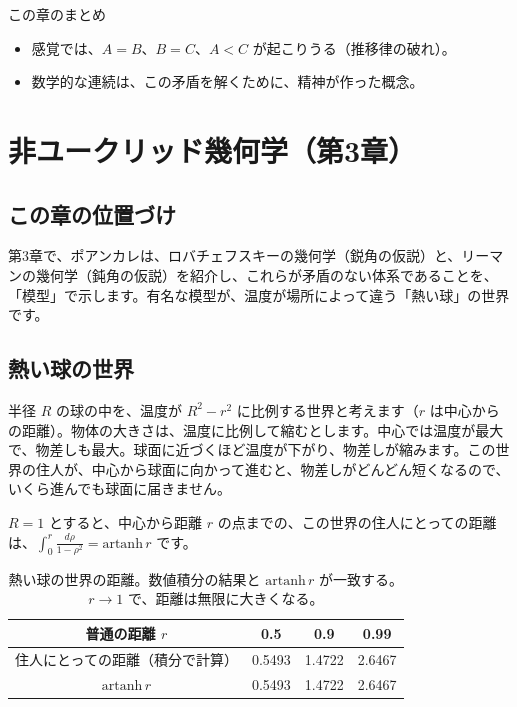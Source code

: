 \documentclass[a4paper,11pt,openany]{ltjsbook}
\begin{document}
\begin{pointbox}{この章のまとめ}
\begin{itemize}[leftmargin=*]
\item 感覚では、$A=B$、$B=C$、$A<C$ が起こりうる（推移律の破れ）。
\item 数学的な連続は、この矛盾を解くために、精神が作った概念。
\end{itemize}
\end{pointbox}

\chapter{非ユークリッド幾何学（第3章）}

\section{この章の位置づけ}

第3章で、ポアンカレは、ロバチェフスキーの幾何学（鋭角の仮説）と、リーマンの幾何学（鈍角の仮説）を紹介し、これらが矛盾のない体系であることを、「模型」で示します。有名な模型が、温度が場所によって違う「熱い球」の世界です。

\section{熱い球の世界}

半径 $R$ の球の中を、温度が $R^2-r^2$ に比例する世界と考えます（$r$ は中心からの距離）。物体の大きさは、温度に比例して縮むとします。中心では温度が最大で、物差しも最大。球面に近づくほど温度が下がり、物差しが縮みます。この世界の住人が、中心から球面に向かって進むと、物差しがどんどん短くなるので、いくら進んでも球面に届きません。

$R=1$ とすると、中心から距離 $r$ の点までの、この世界の住人にとっての距離は、$\displaystyle\int_0^r\frac{d\rho}{1-\rho^2}=\mathrm{artanh}\,r$ です。

\begin{table}[htbp]
\centering
\begin{tabular}{c|ccc}
\toprule
普通の距離 $r$ & 0.5 & 0.9 & 0.99\\
\midrule
住人にとっての距離（積分で計算） & 0.5493 & 1.4722 & 2.6467\\
$\mathrm{artanh}\,r$ & 0.5493 & 1.4722 & 2.6467\\
\bottomrule
\end{tabular}
\caption{熱い球の世界の距離。数値積分の結果と $\mathrm{artanh}\,r$ が一致する。$r\to1$ で、距離は無限に大きくなる。}
\end{table}
\end{document}
